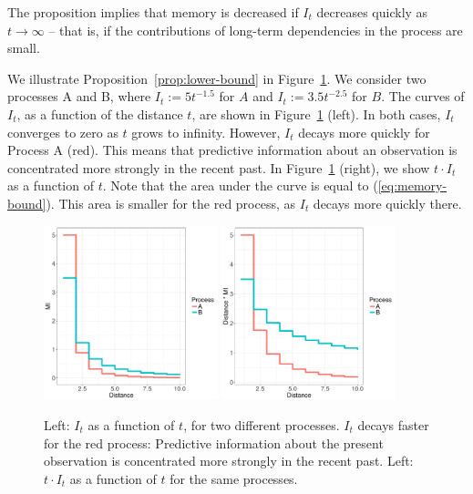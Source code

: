 The proposition implies that memory is decreased if $I_t$ decreases quickly as $t \rightarrow \infty$ -- that is, if the contributions of long-term dependencies in the process are small.

We illustrate Proposition~\ref{prop:lower-bound} in Figure~\ref{fig:basic}.
We consider two processes A and B, where $I_t := 5t^{-1.5}$ for $A$ and $I_t := 3.5 t^{-2.5}$ for $B$.
The curves of $I_t$, as a function of the distance $t$, are shown in Figure~\ref{fig:basic} (left).
In both cases, $I_t$ converges to zero as $t$ grows to infinity. 
However, $I_t$ decays more quickly for Process A (red).
This means that predictive information about an observation is concentrated more strongly in the recent past.
In Figure~\ref{fig:basic} (right), we show $t\cdot I_t$ as a function of $t$.
Note that the area under the curve is equal to (\ref{eq:memory-bound}).
This area is smaller for the red process, as $I_t$ decays more quickly there.  



\begin{figure}
\includegraphics[width=0.45\textwidth]{figures/decay.pdf}
\includegraphics[width=0.45\textwidth]{figures/memory.pdf}
%
	\caption{Left: $I_t$ as a function of $t$, for two different processes. $I_t$ decays faster for the red process: Predictive information about the present observation is concentrated more strongly in the recent past. Left: $t \cdot I_t$ as a function of $t$ for the same processes. }\label{fig:basic}
\end{figure}

